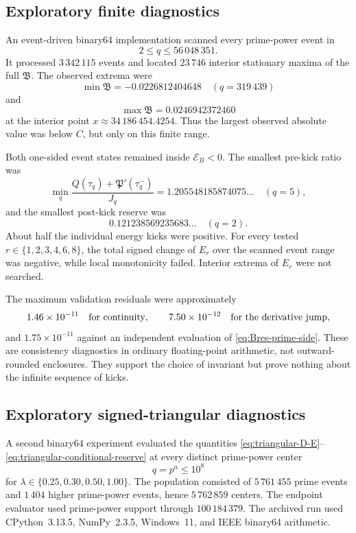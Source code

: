 \documentclass[11pt,a4paper]{article}
\numberwithin{equation}{section}
\theoremstyle{definition}
\newcommand{\Xdirect}{56\,048\,351}
\newcommand{\Bres}{\mathfrak B}
\begin{document}
\subsection{Exploratory finite diagnostics}

An event-driven binary64 implementation scanned every prime-power event in
\[
  2\le q\le\Xdirect.
\]
It processed \(3\,342\,115\) events and located \(23\,746\) interior
stationary maxima of the full \(\Bres\).  The observed extrema were
\[
  \min\Bres=-0.0226812404648
  \quad(q=319\,439)
\]
and
\[
  \max\Bres=0.0246942372460
\]
at the interior point \(x\approx34\,186\,454.4254\).  Thus the largest
observed absolute value was below \(C\), but only on this finite range.

Both one-sided event states remained inside \(\mathcal E_B<0\).  The smallest
pre-kick ratio was
\begin{equation}\label{eq:observed-kick-ratio}
  \min_q
  \frac{Q(\tau_q)+\mathfrak P'(\tau_q^-)}{J_q}
  =1.205548185874075\ldots
  \quad(q=5),
\end{equation}
and the smallest post-kick reserve was
\[
  0.121238569235683\ldots
  \quad(q=2).
\]
About half the individual energy kicks were positive.  For every tested
\(r\in\{1,2,3,4,6,8\}\), the total signed change of \(E_r\) over the scanned
event range was negative, while local monotonicity failed.  Interior extrema
of \(E_r\) were not searched.

The maximum validation residuals were approximately
\[
  1.46\times10^{-11}
  \quad\hbox{for continuity},
  \qquad
  7.50\times10^{-12}
  \quad\hbox{for the derivative jump},
\]
and \(1.75\times10^{-11}\) against an independent evaluation of
\eqref{eq:Bres-prime-side}.  These are consistency diagnostics in ordinary
floating-point arithmetic, not outward-rounded enclosures.  They support the
choice of invariant but prove nothing about the infinite sequence of kicks.

\subsection{Exploratory signed-triangular diagnostics}

A second binary64 experiment evaluated the quantities
\eqref{eq:triangular-D-E}--\eqref{eq:triangular-conditional-reserve} at every
distinct prime-power center
\[
  q=p^a\le10^8
\]
for \(\lambda\in\{0.25,0.30,0.50,1.00\}\).  The population consisted of
\(5\,761\,455\) prime events and \(1\,404\) higher prime-power events, hence
\(5\,762\,859\) centers.  The endpoint evaluator used prime-power support
through \(100\,184\,379\).  The archived run used CPython~3.13.5,
NumPy~2.3.5, Windows~11, and IEEE binary64 arithmetic.
\end{document}
